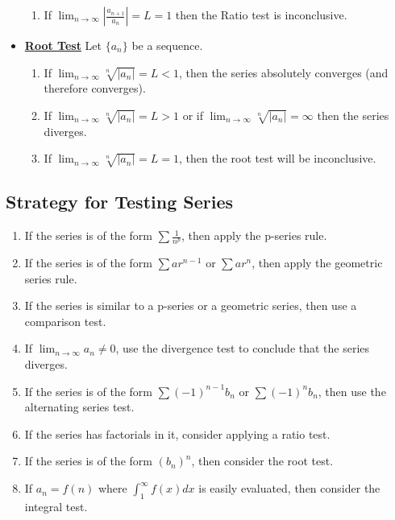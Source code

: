 \documentclass[11pt]{article}
\newcommand{\dfn}[1]{\underline{\textbf{#1}}}
\begin{document}
\begin{itemize}[noitemsep]
\begin{enumerate}[noitemsep]
		\item If $\lim_{n \rightarrow \infty} \left| \frac{a_{n+1}}{a_n} \right| = L = 1$ then the Ratio test is inconclusive. 
	\end{enumerate}
	\item \dfn{Root Test} Let $\{ a_n \}$ be a sequence. 
	\begin{enumerate}[noitemsep]
		\item If $\lim_{n \rightarrow \infty} \sqrt[n]{|a_n|} = L < 1$, then the series absolutely converges (and therefore converges). 
		\item If $\lim_{n \rightarrow \infty} \sqrt[n]{|a_n|} = L > 1$ or if $\lim_{n \rightarrow \infty} \sqrt[n]{|a_n|} = \infty$ then the series diverges. 
		\item If $\lim_{n \rightarrow \infty} \sqrt[n]{|a_n|} = L = 1$, then the root test will be inconclusive. 
	\end{enumerate}
\end{itemize}
\subsection{Strategy for Testing Series}
\begin{enumerate}[noitemsep]
	\item If the series is of the form $\sum \frac{1}{n^p}$, then apply the p-series rule. 
	\item If the series is of the form $\sum ar^{n-1}$ or $\sum ar^n$, then apply the geometric series rule. 
	\item If the series is similar to a p-series or a geometric series, then use a comparison test. 
	\item If $\lim_{n \rightarrow \infty} a_n \neq 0$, use the divergence test to conclude that the series diverges. 
	\item If the series is of the form $\sum (-1)^{n-1} b_n$ or $\sum (-1)^n b_n$, then use the alternating series test. 
	\item If the series has factorials in it, consider applying a ratio test. 
	\item If the series is of the form $(b_n)^n$, then consider the root test. 
	\item If $a_n = f(n)$ where $\int_1^\infty f(x) dx$ is easily evaluated, then consider the integral test.
\end{enumerate}
\end{document}

